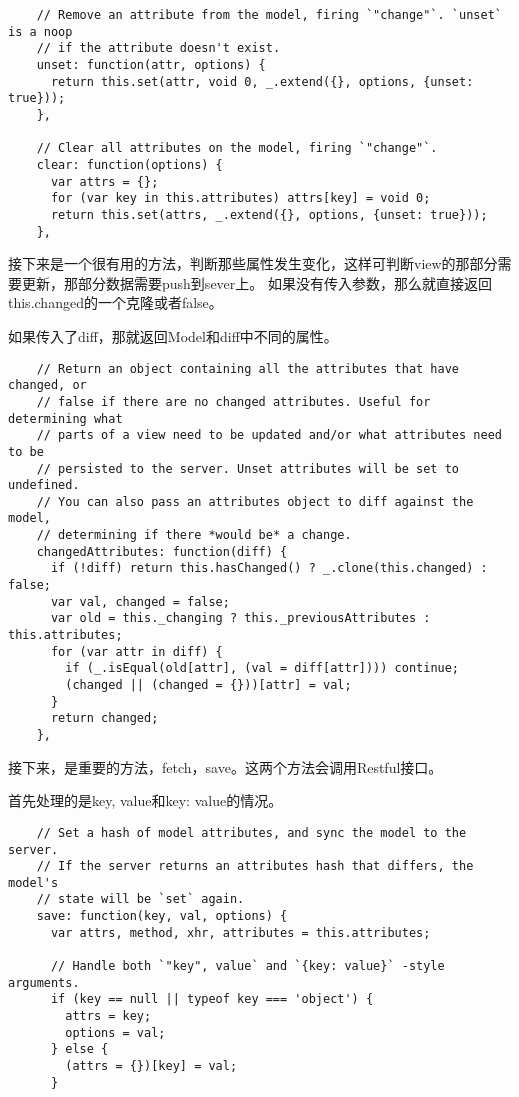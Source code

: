   \begin{lstlisting}
    // Remove an attribute from the model, firing `"change"`. `unset` is a noop
    // if the attribute doesn't exist.
    unset: function(attr, options) {
      return this.set(attr, void 0, _.extend({}, options, {unset: true}));
    },

    // Clear all attributes on the model, firing `"change"`.
    clear: function(options) {
      var attrs = {};
      for (var key in this.attributes) attrs[key] = void 0;
      return this.set(attrs, _.extend({}, options, {unset: true}));
    },

  \end{lstlisting}

  接下来是一个很有用的方法，判断那些属性发生变化，这样可判断view的那部分需要更新，那部分数据需要push到sever上。
  如果没有传入参数，那么就直接返回this.changed的一个克隆或者false。

  如果传入了diff，那就返回Model和diff中不同的属性。
  \begin{lstlisting}
    // Return an object containing all the attributes that have changed, or
    // false if there are no changed attributes. Useful for determining what
    // parts of a view need to be updated and/or what attributes need to be
    // persisted to the server. Unset attributes will be set to undefined.
    // You can also pass an attributes object to diff against the model,
    // determining if there *would be* a change.
    changedAttributes: function(diff) {
      if (!diff) return this.hasChanged() ? _.clone(this.changed) : false;
      var val, changed = false;
      var old = this._changing ? this._previousAttributes : this.attributes;
      for (var attr in diff) {
        if (_.isEqual(old[attr], (val = diff[attr]))) continue;
        (changed || (changed = {}))[attr] = val;
      }
      return changed;
    },
  \end{lstlisting}

  接下来，是重要的方法，fetch，save。这两个方法会调用Restful接口。

  首先处理的是key, value和{key: value}的情况。

  \begin{lstlisting}
    // Set a hash of model attributes, and sync the model to the server.
    // If the server returns an attributes hash that differs, the model's
    // state will be `set` again.
    save: function(key, val, options) {
      var attrs, method, xhr, attributes = this.attributes;

      // Handle both `"key", value` and `{key: value}` -style arguments.
      if (key == null || typeof key === 'object') {
        attrs = key;
        options = val;
      } else {
        (attrs = {})[key] = val;
      }
  \end{lstlisting}

